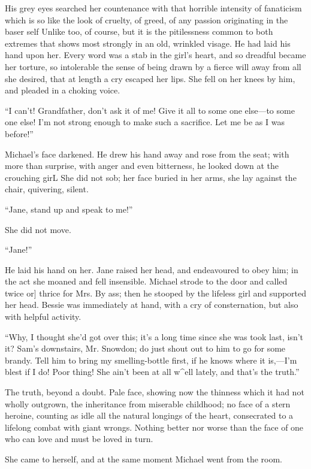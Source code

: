 His grey eyes searched her countenance with that horrible intensity of
fanaticism which is so like the look of cruelty, of greed, of any
passion originating in the baser self Unlike too, of course, but it is
the pitilessness common to both extremes that shows most strongly in an
old, wrinkled visage. He had laid his hand upon her. Every word was a
stab in the girl's heart, and so dreadful became her torture, so
intolerable the sense of being drawn by a fierce will away from all she
desired, that at length a cry escaped her lips. She fell on her knees by
him, and pleaded in a choking voice.

``I can't! Grandfather, don't ask it of me! Give it all to some one
else---to some one else! I'm not strong enough to make such a sacrifice.
Let me be as I was before!''

Michael's face darkened. He drew his hand away and rose from the seat;
with more than {}surprise, with anger and even bitterness, he looked
down at the crouching girL She did not sob; her face buried in her arms,
she lay against the chair, quivering, silent.

``Jane, stand up and speak to me!''

She did not move.

``Jane!''

He laid his hand on her. Jane raised her head, and endeavoured to obey
him; in the act she moaned and fell insensible. Michael strode to the
door and called twice or{]} thrice for Mrs. By ass; then he stooped by
the lifeless girl and supported her head. Bessie was immediately at
hand, with a cry of consternation, but also with helpful activity.

``Why, I thought she'd got over this; it's a long time since she was
took last, isn't it? Sam's downstairs, Mr. Snowdon; do just shout out to
him to go for some brandy. Tell him to bring my smelling-bottle first,
if he knows where it is,---I'm blest if I do! Poor thing! She ain't been
at all w\^{}ell lately, and that's the truth.''

The truth, beyond a doubt. Pale face, showing now the thinness which it
had not wholly outgrown, the inheritance from {}miserable childhood; no
face of a stern heroine, counting as idle all the natural longings of
the heart, consecrated to a lifelong combat with giant wrongs. Nothing
better nor worse than the face of one who can love and must be loved in
turn.

She came to herself, and at the same moment Michael went from the room.


